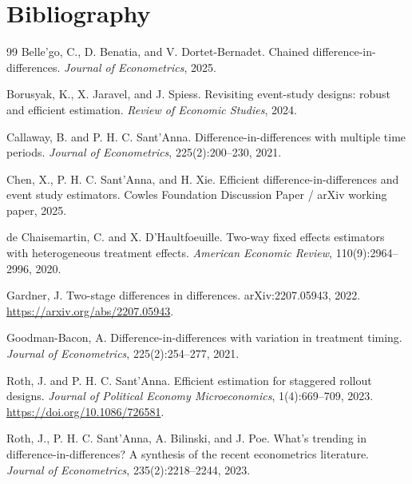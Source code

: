 \documentclass[11pt]{article}
\theoremstyle{definition}
\theoremstyle{plain}
\theoremstyle{remark}
\begin{document}
\section*{Bibliography}
\begin{thebibliography}{99}
Belle'go, C., D. Benatia, and V. Dortet-Bernadet.
\newblock Chained difference-in-differences.
\newblock \emph{Journal of Econometrics}, 2025.

Borusyak, K., X. Jaravel, and J. Spiess.
\newblock Revisiting event-study designs: robust and efficient estimation.
\newblock \emph{Review of Economic Studies}, 2024.

Callaway, B. and P. H. C. Sant'Anna.
\newblock Difference-in-differences with multiple time periods.
\newblock \emph{Journal of Econometrics}, 225(2):200--230, 2021.

Chen, X., P. H. C. Sant'Anna, and H. Xie.
\newblock Efficient difference-in-differences and event study estimators.
\newblock Cowles Foundation Discussion Paper / arXiv working paper, 2025.

de Chaisemartin, C. and X. D'Haultfoeuille.
\newblock Two-way fixed effects estimators with heterogeneous treatment effects.
\newblock \emph{American Economic Review}, 110(9):2964--2996, 2020.

Gardner, J.
\newblock Two-stage differences in differences.
\newblock arXiv:2207.05943, 2022.  \url{https://arxiv.org/abs/2207.05943}.

Goodman-Bacon, A.
\newblock Difference-in-differences with variation in treatment timing.
\newblock \emph{Journal of Econometrics}, 225(2):254--277, 2021.

Roth, J. and P. H. C. Sant'Anna.
\newblock Efficient estimation for staggered rollout designs.
\newblock \emph{Journal of Political Economy Microeconomics}, 1(4):669--709,
2023.  \url{https://doi.org/10.1086/726581}.

Roth, J., P. H. C. Sant'Anna, A. Bilinski, and J. Poe.
\newblock What's trending in difference-in-differences? A synthesis of the recent econometrics literature.
\newblock \emph{Journal of Econometrics}, 235(2):2218--2244, 2023.


\end{thebibliography}
\end{document}

